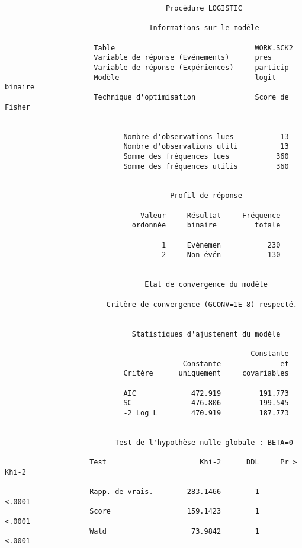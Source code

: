 \begin{verbatim}
                                      Procédure LOGISTIC

                                  Informations sur le modèle

                     Table                                 WORK.SCK2
                     Variable de réponse (Evénements)      pres
                     Variable de réponse (Expériences)     particip
                     Modèle                                logit binaire
                     Technique d'optimisation              Score de Fisher


                            Nombre d'observations lues           13
                            Nombre d'observations utili          13
                            Somme des fréquences lues           360
                            Somme des fréquences utilis         360


                                       Profil de réponse

                                Valeur     Résultat     Fréquence
                              ordonnée     binaire         totale

                                     1     Evénemen           230
                                     2     Non-évén           130


                                 Etat de convergence du modèle

                        Critère de convergence (GCONV=1E-8) respecté.


                              Statistiques d'ajustement du modèle

                                                          Constante
                                          Constante              et
                            Critère      uniquement     covariables

                            AIC             472.919         191.773
                            SC              476.806         199.545
                            -2 Log L        470.919         187.773


                          Test de l'hypothèse nulle globale : BETA=0

                    Test                      Khi-2      DDL     Pr > Khi-2

                    Rapp. de vrais.        283.1466        1         <.0001
                    Score                  159.1423        1         <.0001
                    Wald                    73.9842        1         <.0001


\end{verbatim}
